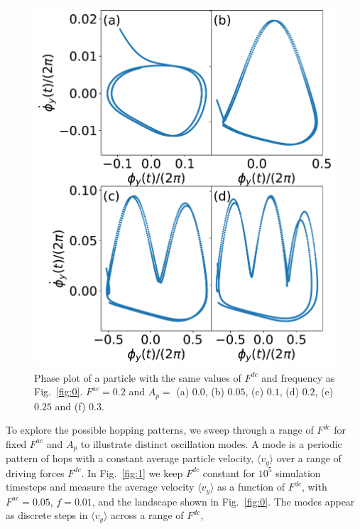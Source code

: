 \documentclass[twocolumn,preprintnumbers,amsmath,amssymb,aps,prx]{revtex4}
\begin{document}
  \begin{center}
    \begin{figure}[h!]
      \centering
      \includegraphics[width=\columnwidth]{phase.pdf}
      \caption{
        Phase plot of a particle with the same values of $F^{dc}$ and frequency as Fig.~\ref{fig:0}.  $F^{ac} = 0.2$ and $A_p = $ (a) $0.0$, (b) $0.05$, (c) $0.1$, (d) $0.2$, (e) $0.25$ and (f) $0.3$.
      }
      \label{fig:phase}
    \end{figure}
  \end{center}

To explore the possible hopping patterns,
we sweep through a range of $F^{dc}$ for fixed $F^{ac}$ and $A_p$
to illustrate
distinct oscillation modes. %
A mode is a periodic pattern of hops
with a constant average particle velocity, $\langle {v}_{y} \rangle$
over a range of driving forces $F^{dc}$.
In Fig.~\ref{fig:1} 
we keep $F^{dc}$ constant
for $10^5$ simulation timesteps
and 
measure the average velocity $\langle v_y \rangle $ 
as a function of $F^{dc}$,
with $F^{ac} = 0.05$, $f=0.01$, and the landscape %
shown in Fig.~\ref{fig:0}.
The modes appear as 
discrete steps in $\langle v_y \rangle$ %
across a range of $F^{dc}$,
\end{document}
